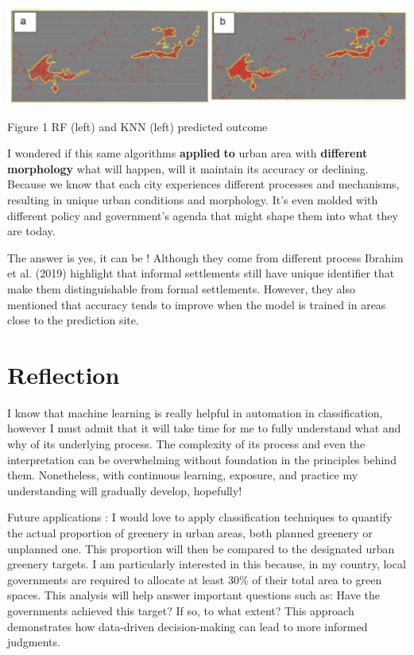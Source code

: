\documentclass[
  letterpaper,
  DIV=11,
  numbers=noendperiod]{scrreprt}
\begin{document}
\includegraphics[width=8.35417in,height=\textheight]{images/clipboard-31491687.png}

Figure 1 RF (left) and KNN (left) predicted outcome

I wondered if this same algorithms \textbf{applied} \textbf{to} urban
area with \textbf{different morphology} what will happen, will it
maintain its accuracy or declining. Because we know that each city
experiences different processes and mechanisms, resulting in unique
urban conditions and morphology. It's even molded with different policy
and government's agenda that might shape them into what they are today.

The answer is yes, it can be ! Although they come from different process
Ibrahim et al. (2019) highlight that informal settlements still have
unique identifier that make them distinguishable from formal
settlements. However, they also mentioned that accuracy tends to improve
when the model is trained in areas close to the prediction site.

\hypertarget{reflection-3}{%
\section{Reflection}\label{reflection-3}}

I know that machine learning is really helpful in automation in
classification, however I must admit that it will take time for me to
fully understand what and why of its underlying process. The complexity
of its process and even the interpretation can be overwhelming without
foundation in the principles behind them. Nonetheless, with continuous
learning, exposure, and practice my understanding will gradually
develop, hopefully!

Future applications : I would love to apply classification techniques to
quantify the actual proportion of greenery in urban areas, both planned
greenery or unplanned one. This proportion will then be compared to the
designated urban greenery targets. I am particularly interested in this
because, in my country, local governments are required to allocate at
least 30\% of their total area to green spaces. This analysis will help
answer important questions such as: Have the governments achieved this
target? If so, to what extent? This approach demonstrates how
data-driven decision-making can lead to more informed judgments.
\end{document}
